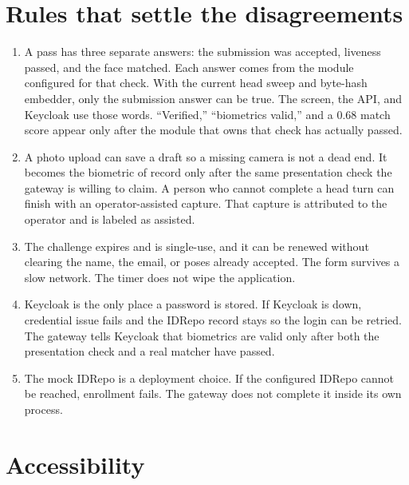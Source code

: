 \documentclass[11pt]{article}
\begin{document}
\section{Rules that settle the disagreements}

\begin{enumerate}[leftmargin=1.4em,itemsep=0.55em]
  \item A pass has three separate answers: the submission was accepted, liveness passed, and the face matched. Each answer comes from the module configured for that check. With the current head sweep and byte-hash embedder, only the submission answer can be true. The screen, the API, and Keycloak use those words. ``Verified,'' ``biometrics valid,'' and a 0.68 match score appear only after the module that owns that check has actually passed.

  \item A photo upload can save a draft so a missing camera is not a dead end. It becomes the biometric of record only after the same presentation check the gateway is willing to claim. A person who cannot complete a head turn can finish with an operator-assisted capture. That capture is attributed to the operator and is labeled as assisted.

  \item The challenge expires and is single-use, and it can be renewed without clearing the name, the email, or poses already accepted. The form survives a slow network. The timer does not wipe the application.

  \item Keycloak is the only place a password is stored. If Keycloak is down, credential issue fails and the IDRepo record stays so the login can be retried. The gateway tells Keycloak that biometrics are valid only after both the presentation check and a real matcher have passed.

  \item The mock IDRepo is a deployment choice. If the configured IDRepo cannot be reached, enrollment fails. The gateway does not complete it inside its own process.
\end{enumerate}

\section{Accessibility}
\end{document}
